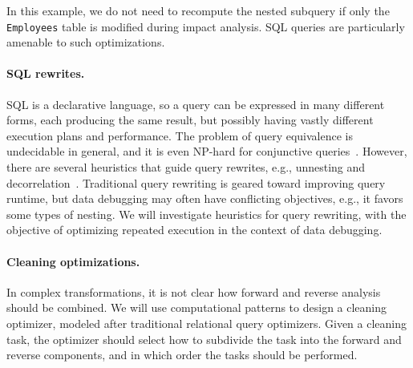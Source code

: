\noindent
In this example, we do not need to recompute the nested subquery if
only the \texttt{Employees} table is modified during impact
analysis. SQL queries are particularly amenable to such optimizations.

\paragraph{SQL rewrites.} %
\label{par:sql_rewrites}
SQL is a declarative language, so a query can be expressed in many different forms, each producing the same result, but possibly having vastly different execution plans and performance. The problem of query equivalence is undecidable in general, and it is even NP-hard for conjunctive queries~\cite{abiteboul1994foundations,DBLP:conf/pods/CalvaneseGL98}. However, there are several heuristics that guide query rewrites, e.g., unnesting and decorrelation~\cite{DBLP:conf/sigmod/PiraheshHH92}. Traditional query rewriting is geared toward improving query runtime, but data debugging may often have conflicting objectives, e.g., it favors some types of nesting. We will investigate heuristics for query rewriting, with the objective of optimizing repeated execution in the context of data debugging.


\paragraph{Cleaning optimizations.} %
\label{par:cleaning_optimizations}
In complex transformations, it is not clear how forward and reverse analysis
should be combined. We will use computational patterns to design a cleaning
optimizer, modeled after traditional relational query optimizers. Given a
cleaning task, the optimizer should select how to subdivide the task into the
forward and reverse components, and in which order the tasks should be
performed.

